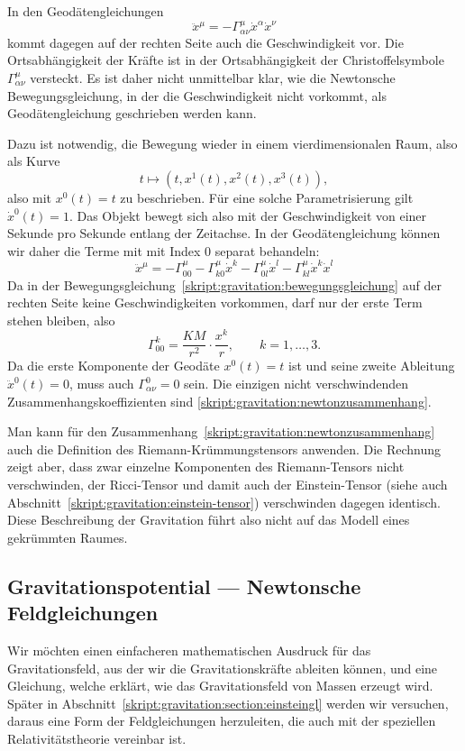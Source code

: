 In den Geodätengleichungen 
\[
\ddot x^\mu = -\Gamma^\mu_{\alpha\nu}\dot x^\alpha\dot x^\nu
\]
kommt dagegen auf der rechten Seite auch die Geschwindigkeit vor.
Die Ortsabhängigkeit der Kräfte ist in der Ortsabhängigkeit der
Christoffelsymbole $\Gamma^\mu_{\alpha\nu}$ versteckt.
Es ist daher nicht unmittelbar klar, wie die Newtonsche Bewegungsgleichung,
in der die Geschwindigkeit nicht vorkommt, als Geodätengleichung geschrieben
werden kann.

Dazu ist notwendig, die Bewegung wieder in einem vierdimensionalen Raum,
also als Kurve
\[
t\mapsto (t,x^1(t),x^2(t),x^3(t)),
\]
also mit $x^0(t)=t$ zu beschrieben.
Für eine solche Parametrisierung gilt $\dot x^0(t)=1$.
Das Objekt bewegt sich also mit der Geschwindigkeit von einer Sekunde pro
Sekunde entlang der Zeitachse.
In der Geodätengleichung können wir daher die Terme mit mit Index $0$
separat behandeln:
\[
\ddot x^\mu
=
-\Gamma^\mu_{00}
-\Gamma^\mu_{k0}\dot x^k -\Gamma^\mu_{0l}\dot x^l
- \Gamma^\mu_{kl}\dot x^k\dot x^l
\]
Da in der Bewegungsgleichung~\eqref{skript:gravitation:bewegungsgleichung}
auf der rechten Seite keine Geschwindigkeiten vorkommen, darf nur der
erste Term stehen bleiben, also
\begin{equation}
\Gamma^k_{00} = \frac{KM}{r^2}\cdot \frac{x^k}{r},\qquad k=1,\dots,3.
\label{skript:gravitation:newtonzusammenhang}
\end{equation}
Da die erste Komponente der Geodäte $x^0(t)=t$ ist und seine zweite
Ableitung $\ddot x^0(t)=0$, muss auch $\Gamma^0_{\alpha\nu}=0$ sein.
Die einzigen nicht verschwindenden Zusammenhangskoeffizienten sind
\eqref{skript:gravitation:newtonzusammenhang}.

Man kann für den Zusammenhang~\eqref{skript:gravitation:newtonzusammenhang}
auch die Definition des Riemann-Krümmungstensors anwenden.
Die Rechnung zeigt aber, dass zwar einzelne Komponenten des Riemann-Tensors
nicht verschwinden, der Ricci-Tensor und damit auch der Einstein-Tensor
(siehe auch Abschnitt~\ref{skript:gravitation:einstein-tensor})
verschwinden dagegen identisch.
Diese Beschreibung der Gravitation führt also nicht auf das Modell
eines gekrümmten Raumes.

\subsection{Gravitationspotential --- Newtonsche Feldgleichungen}
Wir möchten einen einfacheren mathematischen Ausdruck für das Gravitationsfeld,
aus der wir die Gravitationskräfte ableiten können, und eine Gleichung,
welche erklärt, wie das Gravitationsfeld von Massen erzeugt wird.
Später in Abschnitt~\ref{skript:gravitation:section:einsteingl}
werden wir versuchen, daraus eine Form der Feldgleichungen herzuleiten,
die auch mit der speziellen Relativitätstheorie vereinbar ist.


